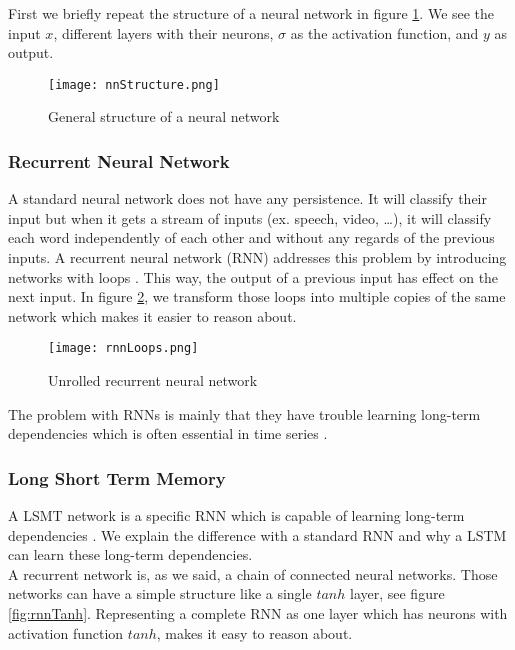 First we briefly repeat the structure of a neural network in figure \ref{fig:nnStructure}. We see the input $x$, different layers with their neurons, $\sigma$ as the activation function, and $y$ as output. \\

\begin{figure}[!htb]
	\centering
	\texttt{[image: nnStructure.png]}
	\caption{General structure of a neural network \cite{IMECJaak}}
	\label{fig:nnStructure}
\end{figure} 

\subsubsection{Recurrent Neural Network}
\label{sec:rnn}

A standard neural network does not have any persistence. It will classify their input but when it gets a stream of inputs (ex. speech, video, \ldots), it will classify each word independently of each other and without any regards of the previous inputs. A recurrent neural network (RNN) addresses this problem by introducing networks with loops \cite{rnnOrigin:article}. This way, the output of a previous input has effect on the next input. In figure \ref{fig:rnnLoops}, we transform those loops into multiple copies of the same network which makes it easier to reason about. \\

\begin{figure}[!htb]
	\centering
	\texttt{[image: rnnLoops.png]}
	\caption{Unrolled recurrent neural network \cite{IMECJaak}}
	\label{fig:rnnLoops}
\end{figure} 

The problem with RNNs is mainly that they have trouble learning long-term dependencies which is often essential in time series \cite{longDepRNN:article}.


\subsubsection{Long Short Term Memory}
\label{sec:lstm}

A LSMT network is a specific RNN which is capable of learning long-term dependencies \cite{lstmDep:thesis}. We explain the difference with a standard RNN and why a LSTM can learn these long-term dependencies. \\

A recurrent network is, as we said, a chain of connected neural networks. Those networks can have a simple structure like a single $tanh$ layer, see figure \ref{fig:rnnTanh}. Representing a complete RNN as one layer which has neurons with activation function $tanh$, makes it easy to reason about. \\

